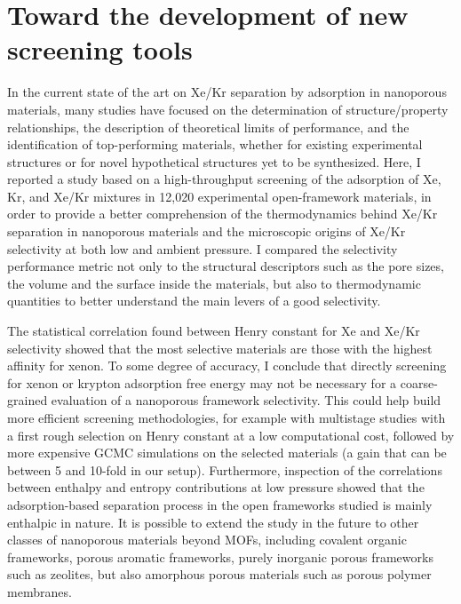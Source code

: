 \documentclass[main.tex]{subfiles}
\begin{document}
\section{Toward the development of new screening tools}

In the current state of the art on Xe/Kr separation by adsorption in nanoporous materials, many studies have focused on the determination of structure/property relationships, the description of theoretical limits of performance, and the identification of top-performing materials, whether for existing experimental structures or for novel hypothetical structures yet to be synthesized. Here, I reported a study based on a high-throughput screening of the adsorption of Xe, Kr, and Xe/Kr mixtures in 12,020 experimental open-framework materials, in order to provide a better comprehension of the thermodynamics behind Xe/Kr separation in nanoporous materials and the microscopic origins of Xe/Kr selectivity at both low and ambient pressure. I compared the selectivity performance metric  not only to the structural descriptors such as the pore sizes, the volume and the surface inside the materials, but also to thermodynamic quantities to better understand the main levers of a good selectivity.

The statistical correlation found between Henry constant for Xe and Xe/Kr selectivity showed that the most selective materials are those with the highest affinity for xenon. To some degree of accuracy, I conclude that directly screening for xenon or krypton adsorption free energy may not be necessary for a coarse-grained evaluation of a nanoporous framework selectivity. This could help build more efficient screening methodologies, for example with multistage studies with a first rough selection on Henry constant at a low computational cost, followed by more expensive GCMC simulations on the selected materials (a gain that can be between 5 and 10-fold in our setup). Furthermore, inspection of the correlations between enthalpy and entropy contributions at low pressure showed that the adsorption-based separation process in the open frameworks studied is mainly enthalpic in nature. It is possible to extend the study in the future to other classes of nanoporous materials beyond MOFs, including covalent organic frameworks, porous aromatic frameworks, purely inorganic porous frameworks such as zeolites, but also amorphous porous materials such as porous polymer membranes.
\end{document}
